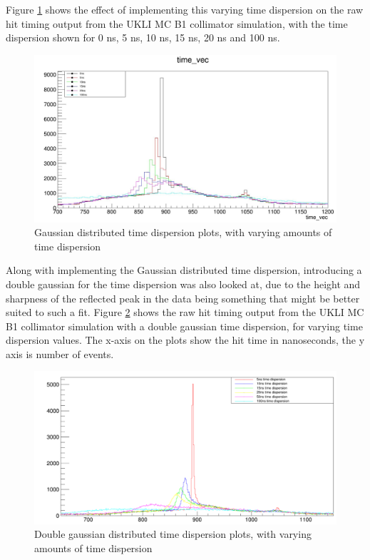 Figure \ref{fig:gauss_time_dispersion} shows the effect of implementing this varying time dispersion on the raw hit timing output from the UKLI MC B1 collimator simulation, with the time dispersion shown for 0 ns, 5 ns, 10 ns, 15 ns, 20 ns and 100 ns. 

\begin{figure}
    \centering
    \includegraphics[width=\textwidth]{Figures/gauss_time_dispersion.PNG}
    \caption{Gaussian distributed time dispersion plots, with varying amounts of time dispersion}
    \label{fig:gauss_time_dispersion}
\end{figure}

Along with implementing the Gaussian distributed time dispersion, introducing a double gaussian for the time dispersion was also looked at, due to the height and sharpness of the reflected peak in the data being something that might be better suited to such a fit. Figure \ref{fig:double_gauss_time_dispersion} shows the raw hit timing output from the UKLI MC B1 collimator simulation with a double gaussian time dispersion, for varying time dispersion values. The x-axis on the plots show the hit time in nanoseconds, the y axis is number of events. 

\begin{figure}
    \centering
    \includegraphics[width=\textwidth]{Figures/double_gauss_time_dispersion.PNG}
    \caption{Double gaussian distributed time dispersion plots, with varying amounts of time dispersion}
    \label{fig:double_gauss_time_dispersion}
\end{figure}

